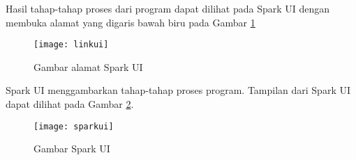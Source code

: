 \begin{enumerate}
Hasil tahap-tahap proses dari program dapat dilihat pada Spark UI dengan membuka alamat yang digaris bawah biru pada Gambar \ref{fig:linkui}

\begin{figure}[H]
    \centering  
    \texttt{[image: linkui]}  
    \caption[Gambar alamat Spark UI]{Gambar alamat Spark UI} 
    \label{fig:linkui} 
\end{figure}

Spark UI menggambarkan tahap-tahap proses program. Tampilan dari Spark UI dapat dilihat pada Gambar \ref{fig:sparkui}.
\begin{figure}[H]
    \centering  
    \texttt{[image: sparkui]}  
    \caption[Gambar Spark UI]{Gambar Spark UI} 
    \label{fig:sparkui} 
\end{figure}





 
\end{enumerate}
